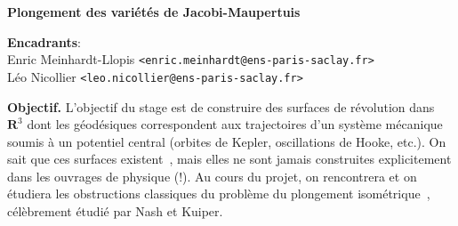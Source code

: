 \documentclass[a4paper,11pt]{article}
\begin{document}
\thispagestyle{empty}

{\bf
	Plongement des variétés de Jacobi-Maupertuis
}

{\bf Encadrants}:\\
Enric Meinhardt-Llopis \verb+<enric.meinhardt@ens-paris-saclay.fr>+\\
Léo Nicollier \verb+<leo.nicollier@ens-paris-saclay.fr>+

{\bf Objectif.}
L'objectif du stage est de construire des surfaces de révolution
dans~$\mathbf{R}^3$ dont les géodésiques correspondent aux trajectoires d'un
système mécanique soumis à un potentiel central (orbites de Kepler,
oscillations de Hooke, etc.). On sait que ces surfaces
existent~\cite{arnomech},
mais elles ne sont jamais construites explicitement dans les ouvrages de
physique (!).
Au cours du projet, on rencontrera et on étudiera les obstructions
classiques du problème du plongement isométrique~\cite{rouviere}, célèbrement
étudié par Nash et Kuiper.
\end{document}
